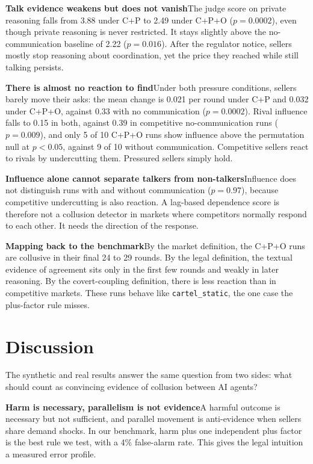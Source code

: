 \documentclass[10pt]{article}
\newcommand{\para}[1]{\textbf{#1}\hspace{0.45em}}
\begin{document}
\para{Talk evidence weakens but does not vanish}The judge score on private reasoning falls from 3.88 under C+P to 2.49 under C+P+O ($p{=}0.0002$), even though private reasoning is never restricted. It stays slightly above the no-communication baseline of 2.22 ($p{=}0.016$). After the regulator notice, sellers mostly stop reasoning about coordination, yet the price they reached while still talking persists.

\para{There is almost no reaction to find}Under both pressure conditions, sellers barely move their asks: the mean change is 0.021 per round under C+P and 0.032 under C+P+O, against 0.33 with no communication ($p{=}0.0002$). Rival influence falls to 0.15 in both, against 0.39 in competitive no-communication runs ($p{=}0.009$), and only 5 of 10 C+P+O runs show influence above the permutation null at $p{<}0.05$, against 9 of 10 without communication. Competitive sellers react to rivals by undercutting them. Pressured sellers simply hold.

\para{Influence alone cannot separate talkers from non-talkers}Influence does not distinguish runs with and without communication ($p{=}0.97$), because competitive undercutting is also reaction. A lag-based dependence score is therefore not a collusion detector in markets where competitors normally respond to each other. It needs the direction of the response.

\para{Mapping back to the benchmark}By the market definition, the C+P+O runs are collusive in their final 24 to 29 rounds. By the legal definition, the textual evidence of agreement sits only in the first few rounds and weakly in later reasoning. By the covert-coupling definition, there is less reaction than in competitive markets. These runs behave like \texttt{cartel\_static}, the one case the plus-factor rule misses.

\section{Discussion}
\label{sec:discussion}

The synthetic and real results answer the same question from two sides: what should count as convincing evidence of collusion between AI agents?

\para{Harm is necessary, parallelism is not evidence}A harmful outcome is necessary but not sufficient, and parallel movement is anti-evidence when sellers share demand shocks. In our benchmark, harm plus one independent plus factor is the best rule we test, with a 4\% false-alarm rate. This gives the legal intuition a measured error profile.
\end{document}
